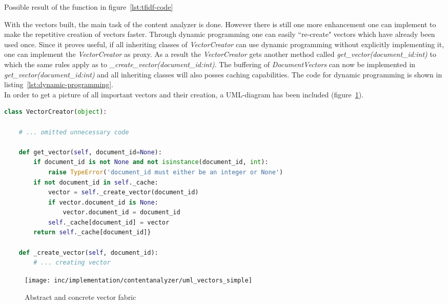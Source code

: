 \begin{table}
    \caption{Possible result of the function in figure~\ref{lst:tfidf-code}}
    \label{tab:tfidf-query-result}
\end{table}


With the vectors built, the main task of the content analyzer is done.
However there is still one more enhancement one can implement to make the repetitive creation of vectors faster.
Through \gls{dynamic programming} one can easily ``re-create" vectors which have already been used once.
Since it proves useful, if all inheriting classes of \textit{VectorCreator} can use dynamic programming without explicitly implementing it, one can implement the \textit{VectorCreator} as \gls{proxy}.
As a result the \textit{VectorCreator} gets another method called \textit{get\_vector(document\_id:int)} to which the same rules apply as to \textit{\_create\_vector(document\_id:int)}.
The buffering of \textit{DocumentVectors} can now be implemented in \textit{get\_vector(document\_id:int)} and all inheriting classes will also posses caching capabilities.
The code for dynamic programming is shown in listing~\ref{lst:dynamic-programming}.\\
In order to get a picture of all important vectors and their creation, a UML-diagram has been included (figure~\ref{fig:uml-vectorssimple}).

\begin{lstlisting}[language=Python,caption={Dynamic programming},label={lst:dynamic-programming},float=h]
class VectorCreator(object):

    # ... omitted unnecessary code

    def get_vector(self, document_id=None):
        if document_id is not None and not isinstance(document_id, int):
            raise TypeError('document_id must either be an integer or None')
        if not document_id in self._cache:
            vector = self._create_vector(document_id)
            if vector.document_id is None:
                vector.document_id = document_id
            self._cache[document_id] = vector
        return self._cache[document_id]}

    def _create_vector(self, document_id):
        # ... creating vector
\end{lstlisting}


\begin{figure}[h]
    \center
    \texttt{[image: inc/implementation/contentanalyzer/uml\_vectors\_simple]}
    \caption{Abstract and concrete vector fabric}
    \label{fig:uml-vectorssimple}
\end{figure}
